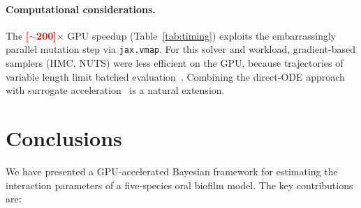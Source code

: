 \documentclass[pdflatex,sn-mathphys-num,lineno]{sn-jnl}
\newcommand{\TBD}[1]{\textcolor{red}{\textbf{[#1]}}}
\begin{document}
\paragraph{Computational considerations.}
The \TBD{$\sim$200}$\times$ GPU speedup (Table~\ref{tab:timing}) exploits the embarrassingly parallel mutation step via \texttt{jax.vmap}.
For this solver and workload, gradient-based samplers (HMC, NUTS) were less efficient on the GPU, because trajectories of variable length limit batched evaluation~\cite{Dance2025FSM}.
Combining the direct-ODE approach with surrogate acceleration~\cite{Fritsch2025BayesianMicrofilms} is a natural extension.

\section{Conclusions}
\label{sec:conclusions}

We have presented a GPU-accelerated Bayesian framework for estimating the interaction parameters of a five-species oral biofilm model.
The key contributions are:
\end{document}
